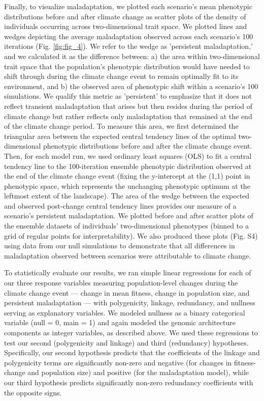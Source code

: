 \documentclass[9pt,twocolumn,twoside,lineno]{new_article}
\begin{document}
Finally, to visualize maladaptation, we plotted each scenario's
mean phenotypic distributions before and after climate change as scatter plots of the density of individuals occurring across
two-dimensional trait space. We plotted lines and wedges depicting the average maladaptation
observed across each scenario's 100 iterations (Fig. \ref{fig:fig_4}).
We refer to the wedge as 'persistent maladaptation,'
and we calculated it as the difference between: a) the area 
within two-dimensional trait space that the population’s phenotypic distribution 
would have needed to shift through during the climate change event to remain 
optimally fit to its environment, and b) the observed area of phenotypic shift within
a scenario's 100 simulations.
We qualify this metric as 'persistent' to emphasize that it does
not reflect transient maladaptation that arises but then
resides during the period of climate change but rather reflects
only maladaptation that remained at the end of the climate change period.
To measure this area, we first determined the triangular area between 
the expected central tendency lines of the optimal two-dimensional phenotypic distributions
before and after the climate change event.
Then, for each model run, we used ordinary least squares (OLS)
to fit a central tendency line to the 100-iteration ensemble phenotypic distribution
observed at the end of the climate change event
(fixing the y-intercept at the (1,1) point in phenotypic 
space, which represents the unchanging phenotypic optimum at the leftmost extent of the landscape).
The area of the wedge between the expected and observed post-change central tendency
lines provides our measure of a scenario's persistent maladaptation.
We plotted before and after scatter plots of the ensemble datasets
of individuals' two-dimensional phenotypes
(binned to a grid of regular points for interpretability).
We also produced these plots (Fig. S4) using data from our null simulations to demonstrate that all differences
in maladaptation observed between scenarios were attributable to climate change.

To statistically evaluate our results,
we ran simple linear regressions
for each of our three response variables measuring
population-level changes during the climate change event --- change in mean fitness, change in population size,
and persistent maladaptation --- with polygenicity,
linkage, redundancy, and nullness serving as explanatory variables.
We modeled nullness as a binary categorical variable (null = 0, main = 1)
and again modeled the genomic architecture components
as integer variables, as described above.
We used these regressions to test our second 
(polygenicity and linkage) and third (redundancy) hypotheses.
Specifically, our second hypothesis predicts that
the coefficients of the linkage and polygenicity terms are significantly
non-zero and negative (for changes in fitness-change
and population size) and positive (for the maladaptation
model),
while our third hypothesis predicts significantly non-zero
redundancy coefficients with the opposite signs.
\end{document}
